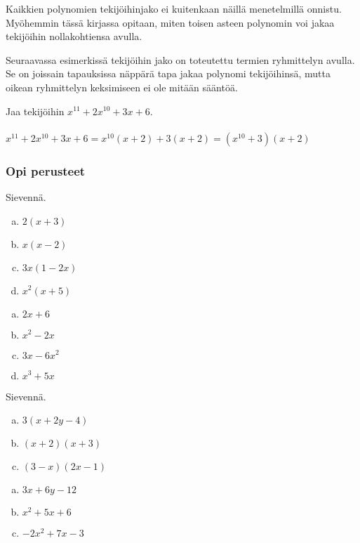 Kaikkien polynomien tekijöihinjako ei kuitenkaan näillä menetelmillä onnistu. Myöhemmin tässä kirjassa opitaan, miten toisen asteen polynomin voi jakaa tekijöihin nollakohtiensa avulla.

Seuraavassa esimerkissä tekijöihin jako on toteutettu termien ryhmittelyn avulla. Se on joissain tapauksissa näppärä tapa jakaa polynomi tekijöihinsä, mutta oikean ryhmittelyn keksimiseen ei ole mitään sääntöä.

\begin{esimerkki}
Jaa tekijöihin $x^{11}+2x^{10}+3x+6$.\\
\quad\\
$x^{11}+2x^{10}+3x+6=x^{10}(x+2)+3(x+2)=(x^{10}+3)(x+2)$
\end{esimerkki}


\Harjoitustehtavat

\subsubsection*{Opi perusteet}

\begin{tehtava}
    Sievennä.
    \begin{enumerate}[a)]
        \item $2(x+3)$
        \item $x(x - 2)$
        \item $3x(1-2x)$
        \item $x^2(x + 5)$
    \end{enumerate}
    \begin{vastaus}
        \begin{enumerate}[a)]
            \item $2x+6$
            \item $x^2 - 2x$
            \item $3x-6x^2$
            \item $x^3 + 5x$
        \end{enumerate}
    \end{vastaus}
\end{tehtava}

\begin{tehtava}
    Sievennä.
    \begin{enumerate}[a)]
        \item $3(x+2y-4)$
        \item $(x+2)(x + 3)$
        \item $(3-x)(2x-1)$
\end{enumerate}
    \begin{vastaus}
        \begin{enumerate}[a)]
            \item $3x+6y-12$
            \item $x^2 +5x+6$
            \item $-2x^2+7x-3$
        \end{enumerate}
    \end{vastaus}
\end{tehtava}

